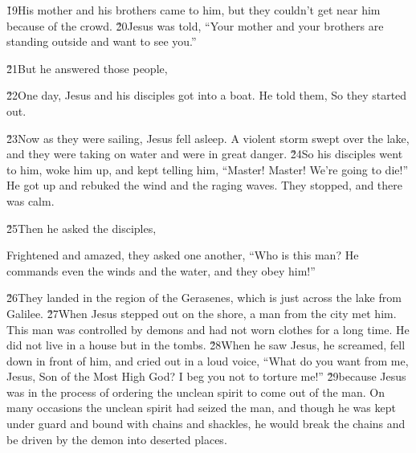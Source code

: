 \v{19}His mother and his brothers came to him, but they couldn't get near him because of the crowd. \v{20}Jesus was told, ``Your mother and your brothers are standing outside and want to see you.''

\v{21}But he answered those people, 

\v{22}One day, Jesus and his disciples got into a boat. He told them,  So they started out.

\v{23}Now as they were sailing, Jesus fell asleep. A violent storm swept over the lake, and they were taking on water and were in great danger. \v{24}So his disciples went to him, woke him up, and kept telling him, ``Master! Master! We're going to die!'' He got up and rebuked the wind and the raging waves. They stopped, and there was calm.

\v{25}Then he asked the disciples, 

Frightened and amazed, they asked one another, ``Who is this man? He commands even the winds and the water, and they obey him!''

\v{26}They landed in the region of the Gerasenes, which is just across the lake from Galilee. \v{27}When Jesus stepped out on the shore, a man from the city met him. This man was controlled by demons and had not worn clothes for a long time. He did not live in a house but in the tombs. \v{28}When he saw Jesus, he screamed, fell down in front of him, and cried out in a loud voice, ``What do you want from me, Jesus, Son of the Most High God? I beg you not to torture me!'' \v{29}because Jesus was in the process of ordering the unclean spirit to come out of the man. On many occasions the unclean spirit had seized the man, and though he was kept under guard and bound with chains and shackles, he would break the chains and be driven by the demon into deserted places.

